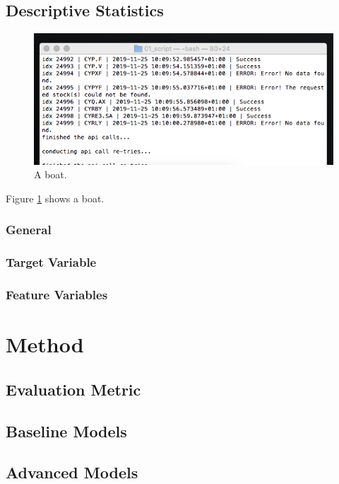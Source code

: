 \documentclass{article}
\begin{document}
	
	\subsection{Descriptive Statistics}
	
	
	\begin{figure}[h]
		\includegraphics[width=\linewidth]{img/test.png}
		\caption{A boat.}
		\label{fig:boat1}
	\end{figure}
	
	Figure \ref{fig:boat1} shows a boat.
	
	
	\subsubsection{General}
	
	\subsubsection{Target Variable}
	
	\subsubsection{Feature Variables}
	

	\section{Method}
	
	\subsection{Evaluation Metric}
	
	\subsection{Baseline Models}
	
	\subsection{Advanced Models}
	
\end{document}
